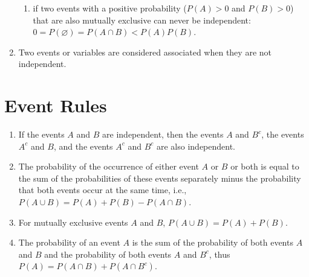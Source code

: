 \begin{enumerate}
\begin{enumerate}
        \item  if two events with a positive probability ($P(A) > 0$ and $P(B) > 0$) that are also mutually exclusive can never be independent: $0 = P(\varnothing) = P(A \cap B) < P(A) P(B)$.
        \hfill \cite{statistics/book/Statistics-for-Data-Scientists/Maurits-Kaptein}
    \end{enumerate}

    \item
    \begin{definition}
        Two events or variables are considered associated when they are not independent.
    \end{definition}
\end{enumerate}


\section{Event Rules}

\begin{enumerate}
    \item If the events $A$ and $B$ are independent, then the events $A$ and $B^c$, the events $A^c$ and $B$, and the events $A^c$ and $B^c$ are also independent.
    \hfill \cite{statistics/book/Statistics-for-Data-Scientists/Maurits-Kaptein}

    \item The probability of the occurrence of either event $A$ or $B$ or both is equal to the sum of the probabilities of these events separately minus the probability that both events occur at the same time, i.e., $P (A \cup B) = P (A) + P (B) - P (A \cap B)$.
    \hfill \cite{statistics/book/Statistics-for-Data-Scientists/Maurits-Kaptein}

    \item For mutually exclusive events $A$ and $B$, $P (A \cup B) = P (A) + P (B)$.
    \hfill \cite{statistics/book/Statistics-for-Data-Scientists/Maurits-Kaptein}

    \item
    \begin{definition}[law of total probability ($P (A) = P (A \cap B) + P (A \cap B^c)$)]
        The probability of an event $A$ is the sum of the probability of both events $A$ and $B$ and the probability of both events $A$ and $B^c$, thus $P (A) = P (A \cap B) + P (A \cap B^c)$.
        \hfill \cite{statistics/book/Statistics-for-Data-Scientists/Maurits-Kaptein}
    \end{definition}
\end{enumerate}




